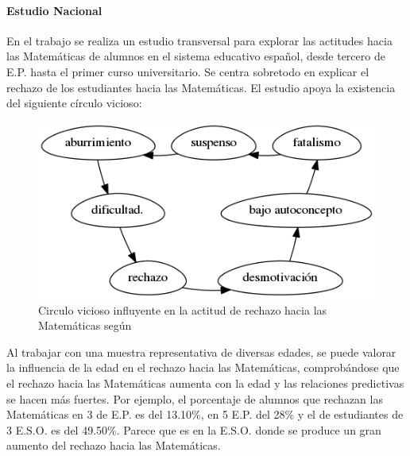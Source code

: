 \paragraph{Estudio Nacional}

En el trabajo \cite{ActitudesHaciaMates} se realiza un estudio transversal para explorar las actitudes hacia las Matemáticas de alumnos en el sistema educativo español, desde tercero de E.P. hasta el primer curso universitario. 
%
Se centra sobretodo en explicar el rechazo de los estudiantes hacia las Matemáticas.
%
El estudio apoya la existencia del siguiente círculo vicioso: 



\begin{figure}[hbt]
\centering
\includegraphics[scale=0.57]{img/circuloVicioso.png}
\caption{Circulo vicioso influyente en la actitud de rechazo hacia las Matemáticas según \cite{ActitudesHaciaMates}}
\label{circuloVicioso}
\end{figure}
\FloatBarrier




Al trabajar con una muestra representativa de diversas edades, se puede valorar la influencia de la edad en el rechazo hacia las Matemáticas, comprobándose que el rechazo hacia las Matemáticas aumenta con la edad y las relaciones predictivas se hacen más fuertes.
%
Por ejemplo, el porcentaje de alumnos que rechazan las Matemáticas en 3 de E.P. es del 13.10\%, en 5 E.P. del 28\%  y el de estudiantes de 3 E.S.O. es del 49.50\%.
%
Parece que es en la E.S.O. donde se produce un gran aumento del rechazo hacia las Matemáticas.



